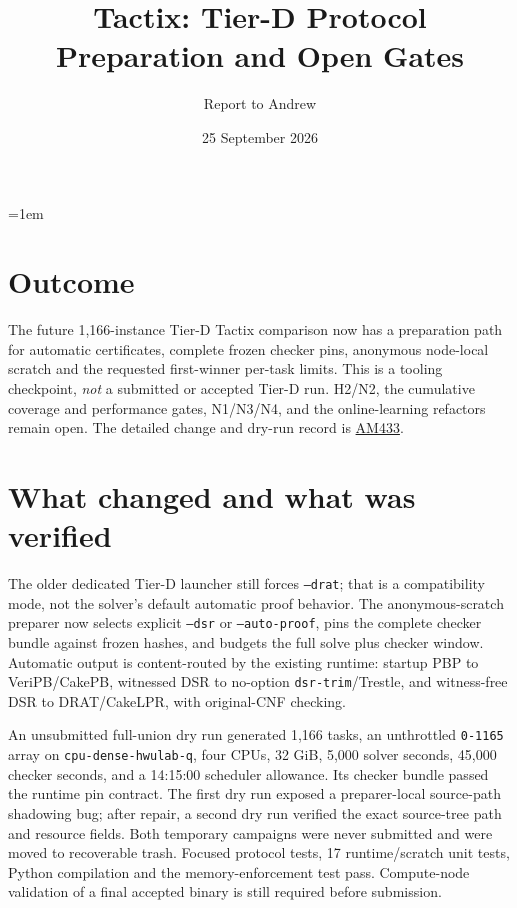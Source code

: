 \documentclass[10pt]{article}
\title{Tactix: Tier-D Protocol Preparation and Open Gates}
\author{Report to Andrew}
\date{25 September 2026}
\begin{document}
\maketitle
\vspace{-1.5em}
\emergencystretch=1em

\section*{Outcome}
The future 1,166-instance Tier-D Tactix comparison now has a preparation
path for automatic certificates, complete frozen checker pins, anonymous
node-local scratch and the requested first-winner per-task limits. This is a
tooling checkpoint, \emph{not} a submitted or accepted Tier-D run. H2/N2,
the cumulative coverage and performance gates, N1/N3/N4, and the
online-learning refactors remain open. The detailed change and dry-run
record is \href{../../benchmarks/reports/2026-09-25-am433-tierd-automatic-preparer.md}{AM433}.

\section*{What changed and what was verified}
The older dedicated Tier-D launcher still forces \texttt{--drat}; that is a
compatibility mode, not the solver's default automatic proof behavior. The
anonymous-scratch preparer now selects explicit \texttt{--dsr} or
\texttt{--auto-proof}, pins the complete checker bundle against frozen
hashes, and budgets the full solve plus checker window. Automatic output is
content-routed by the existing runtime: startup PBP to VeriPB/CakePB,
witnessed DSR to no-option \texttt{dsr-trim}/Trestle, and witness-free DSR to
DRAT/CakeLPR, with original-CNF checking.

An unsubmitted full-union dry run generated 1,166 tasks, an unthrottled
\texttt{0-1165} array on \texttt{cpu-dense-hwulab-q}, four CPUs, 32 GiB,
5,000 solver seconds, 45,000 checker seconds, and a 14:15:00 scheduler
allowance. Its checker bundle passed the runtime pin contract. The first
dry run exposed a preparer-local source-path shadowing bug; after repair, a
second dry run verified the exact source-tree path and resource fields.
Both temporary campaigns were never submitted and were moved to recoverable
trash. Focused protocol tests, 17 runtime/scratch unit tests, Python
compilation and the memory-enforcement test pass. Compute-node validation
of a final accepted binary is still required before submission.
\end{document}
